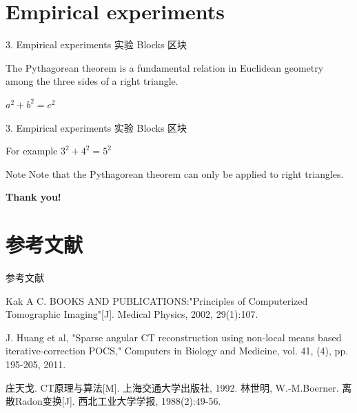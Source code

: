 \documentclass{beamer}
\begin{document}
\section{Empirical experiments}
\label{Sec:experiments}
\begin{frame}{3. Empirical experiments 实验}
	Blocks 区块
	
	\begin{definition}
		The Pythagorean theorem is a fundamental relation in Euclidean geometry among the three sides of a right triangle.
	\end{definition}
	
	\begin{theorem}
		$a^2 + b^2 = c^2$
	\end{theorem}
\end{frame} 

\begin{frame}{3. Empirical experiments 实验}
	Blocks 区块
	
	\begin{exampleblock}{For example}
		$3^2 + 4^2 = 5^2$
	\end{exampleblock}
	
	\begin{alertblock}{Note}
		Note that the Pythagorean theorem can only be applied to right triangles.
	\end{alertblock}
\end{frame} 

\begin{frame}
	\begin{center}
		\Huge{\bf{Thank you!}}
	\end{center}
\end{frame} %
\section{参考文献}
\begin{frame}{参考文献}
	\begin{thebibliography}{0}
		    
		Kak A C. BOOKS AND PUBLICATIONS:"Principles of Computerized Tomographic Imaging"[J]. Medical Physics, 2002, 29(1):107.
		    
		J. Huang et al, "Sparse angular CT reconstruction using non-local means based iterative-correction POCS," Computers in Biology and Medicine, vol. 41, (4), pp. 195-205, 2011.
		    
		庄天戈. CT原理与算法[M]. 上海交通大学出版社, 1992.
		林世明, W.-M.Boerner. 离散Radon变换[J]. 西北工业大学学报, 1988(2):49-56.
	\end{thebibliography}
\end{frame} %


\end{document}
